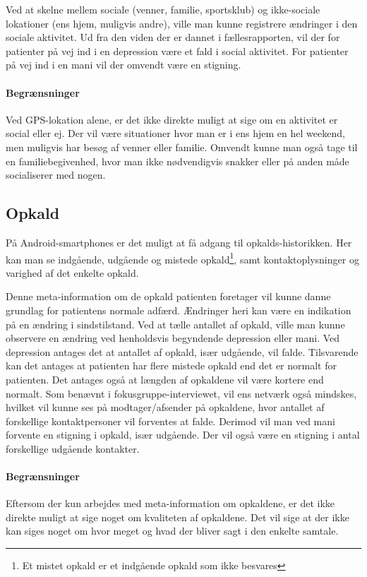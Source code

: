 Ved at skelne mellem sociale (venner, familie, sportsklub) og ikke-sociale lokationer (ens hjem, muligvis andre), ville man kunne registrere ændringer i den sociale aktivitet.
Ud fra den viden der er dannet i fællesrapporten, vil der for patienter på vej ind i en depression være et fald i social aktivitet.
For patienter på vej ind i en mani vil der omvendt være en stigning.

\paragraph{Begrænsninger}
Ved GPS-lokation alene, er det ikke direkte muligt at sige om en aktivitet er social eller ej.
Der vil være situationer hvor man er i ens hjem en hel weekend, men muligvis har besøg af venner eller familie.
Omvendt kunne man også tage til en familiebegivenhed, hvor man ikke nødvendigvis snakker eller på anden måde socialiserer med nogen.

\subsection{Opkald}
På Android-smartphones er det muligt at få adgang til opkalds-historikken.
Her kan man se indgående, udgående og mistede opkald\footnote{Et mistet opkald er et indgående opkald som ikke besvares}, samt kontaktoplysninger og varighed af det enkelte opkald.

Denne meta-information om de opkald patienten foretager vil kunne danne grundlag for patientens normale adfærd.
Ændringer heri kan være en indikation på en ændring i sindstilstand.
Ved at tælle antallet af opkald, ville man kunne observere en ændring ved henholdsvis begyndende depression eller mani.
Ved depression antages det at antallet af opkald, især udgående, vil falde.
Tilsvarende kan det antages at patienten har flere mistede opkald end det er normalt for patienten.
Det antages også at længden af opkaldene vil være kortere end normalt.
Som benævnt i fokusgruppe-interviewet, vil ens netværk også mindskes, hvilket vil kunne ses på modtager/afsender på opkaldene, hvor antallet af forskellige kontaktpersoner vil forventes at falde.
Derimod vil man ved mani forvente en stigning i opkald, især udgående.
Der vil også være en stigning i antal forskellige udgående kontakter.

\paragraph{Begrænsninger}
Eftersom der kun arbejdes med meta-information om opkaldene, er det ikke direkte muligt at sige noget om kvaliteten af opkaldene.
Det vil sige at der ikke kan siges noget om hvor meget og hvad der bliver sagt i den enkelte samtale.

